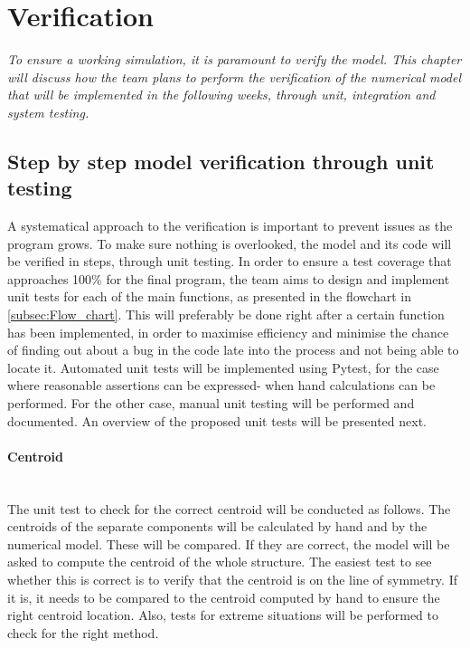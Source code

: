 \section{Verification}
\label{sec:verification}
\textit{To ensure a working simulation, it is paramount to verify the model. This chapter will discuss how the team plans to perform the verification of the numerical model that will be implemented in the following weeks, through unit, integration and system testing.}

\subsection{Step by step model verification through unit testing}
A systematical approach to the verification is important to prevent issues as the program grows. To make sure nothing is overlooked, the model and its code will be verified in steps, through unit testing. In order to ensure a test coverage that approaches 100\% for the final program, the team aims to design and implement unit tests for each of the main functions, as presented in the flowchart in \autoref{subsec:Flow_chart}. This will preferably be done right after a certain function has been implemented, in order to maximise efficiency and minimise the chance of finding out about a bug in the code late into the process and not being able to locate it. Automated unit tests will be implemented using Pytest, for the case where reasonable assertions can be expressed- when hand calculations can be performed. For the other case, manual unit testing will be performed and documented. An overview of the proposed unit tests will be presented next. 

\paragraph{Centroid}\mbox{}\\
\noindent The unit test to check for the correct centroid will be conducted as follows. The centroids of the separate components will be calculated by hand and by the numerical model. These will be compared. If they are correct, the model will be asked to compute the centroid of the whole structure. The easiest test to see whether this is correct is to verify that the centroid is on the line of symmetry. If it is, it needs to be compared to the centroid computed by hand to ensure the right centroid location. Also, tests for extreme situations will be performed to check for the right method.

